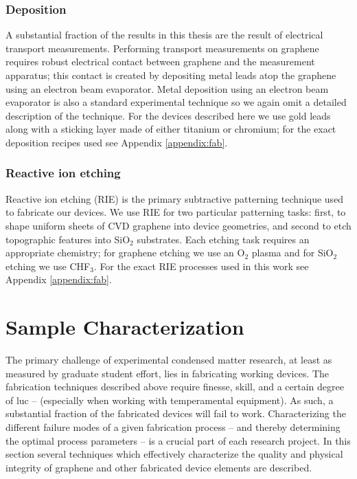 \documentclass[edeposit,fullpage,draftthesis]{uiucthesis2009}
\begin{document}
            \subsubsection{Deposition}
            
            A substantial fraction of the results in this thesis are the result of electrical transport measurements.
            Performing transport measurements on graphene requires robust electrical contact between
            graphene and the measurement apparatus; this contact is created by depositing
            metal leads atop the graphene using an electron beam evaporator. 
            Metal deposition using an electron beam evaporator is also a standard experimental technique
            so we again omit a detailed description of the technique.
            For the devices described here we use gold leads along with a sticking layer made of either
            titanium or chromium; for the exact deposition recipes used see Appendix \ref{appendix:fab}.
            
            \subsubsection{Reactive ion etching}
            
            Reactive ion etching (RIE) is the primary subtractive patterning technique used 
            to fabricate our devices. We use RIE for two particular patterning tasks: first, to 
            shape uniform sheets of CVD graphene into device geometries, and second to etch
            topographic features into SiO$_2$ substrates. 
            Each etching task requires an appropriate chemistry; for graphene etching we use
            an O$_2$ plasma and for SiO$_2$ etching we use CHF$_3$.
            For the exact RIE processes used in this work see Appendix \ref{appendix:fab}.
    
    \section{Sample Characterization}
    
    The primary challenge of experimental condensed matter research, at least as measured by graduate student effort, lies in fabricating working devices. The fabrication techniques described above require finesse, skill, and a certain degree of luc -- (especially when working with temperamental equipment). As such, a substantial fraction of the fabricated devices will fail to work. Characterizing the different failure modes of a given fabrication process -- and thereby determining the optimal process parameters -- is a crucial part of each research project. In this section several techniques which effectively characterize the quality and physical integrity of graphene and other fabricated device elements are described.
    
\end{document}
